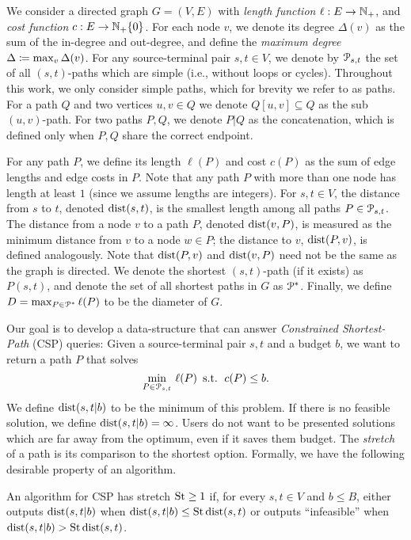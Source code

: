 We consider a directed graph $G=(V,E)$ with \emph{length function} $\ell:E\to \mathbb{N}_+$, and \emph{cost function} $c:E\to \mathbb{N}_+\{0\}$.
For each node $v$, we denote its degree $\Delta(v)$ as the sum of the in-degree and out-degree, and define the \emph{maximum degree} $\Delta \coloneqq \max_v\Delta(v)$.
For any source-terminal pair $s,t\in V$, we denote by $\mathcal{P}_{s,t}$ the set of all $(s,t)$-paths which are simple (i.e., without loops or cycles). 
Throughout this work, we only consider simple paths, which for brevity we refer to as paths.
For a path $Q$ and two vertices $u,v\in Q$ we denote $Q[u,v]\subseteq Q$ as the sub $(u,v)$-path.
For two paths $P,Q$, we denote $P|Q$ as the concatenation, which is defined only when $P,Q$ share the correct endpoint.

For any path $P$, we define its length $\ell(P)$ and cost $c(P)$ as the sum of edge lengths and edge costs in $P$. 
Note that any path $P$ with more than one node has length at least $1$ (since we assume lengths are integers).
For $s,t\in V$, the distance from $s$ to $t$, denoted $\mbox{dist}(s,t)$, is the smallest length among all paths $P\in\mathcal{P}_{s,t}$.
The distance from a node $v$ to a path $P$, denoted $\mbox{dist}(v,P)$, is measured as the minimum distance from $v$ to a node $w\in P$; the distance to $v$, $\mbox{dist}(P,v)$, is defined analogously.
Note that  $\mbox{dist}(P,v)$ and  $\mbox{dist}(v,P)$ need not be the same as the graph is directed.
We denote the shortest $(s,t)$-path (if it exists) as $P(s,t)$, and denote the set of all shortest paths in $G$ as $\mathcal{P}^*$.
Finally, we define $D=\max_{P\in\mathcal{P}^*}\ell(P)$ to be the diameter of $G$.

Our goal is to develop a data-structure that can answer \emph{Constrained Shortest-Path} (CSP) queries: Given a source-terminal pair $s,t$ and a budget $b$, we want to return a path $P$ that solves
\[
\min_{P \in \mathcal{P}_{s,t}}  \, \ell(P) \,
\text{ s.t. } \,  c(P) \leq b.
\]
We define $\mbox{dist}(s,t|b)$ to be the minimum of this problem.
If there is no feasible solution, we define $\mbox{dist}(s,t|b)=\infty$.
Users do not want to be presented solutions which are far away from the optimum, even if it saves them budget.
The \emph{stretch} of a path is its comparison to the shortest option.
Formally, we have the following desirable property of an algorithm.

\begin{definition}[Stretch]
An algorithm for CSP has stretch $\operatorname{St}\geq 1$ if, for every $s,t\in V$ and $b\leq B$, either outputs $\mbox{dist}(s,t|b)$ when $\mbox{dist}(s,t|b)\leq \operatorname{St}\mbox{dist}(s,t)$ or outputs ``infeasible'' when $\mbox{dist}(s,t|b)>\operatorname{St}\mbox{dist}(s,t)$.
\end{definition}

